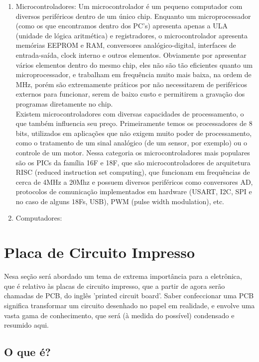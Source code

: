 \begin{enumerate}
\item Microcontroladores:
	Um microcontrolador \'e um pequeno computador com diversos perif\'ericos dentro de um \'unico chip. Enquanto um microprocessador (como os que encontramos dentro dos PC's) apresenta apenas a ULA (unidade de l\'ogica aritm\'etica) e registradores, o microcontrolador apresenta mem\'orias EEPROM e RAM, conversores anal\'ogico-digital, interfaces de entrada-sa\'ida, clock interno e outros elementos. Obviamente por apresentar v\'arios elementos dentro do mesmo chip, eles n\~ao s\~ao t\~ao eficientes quanto um microprocessador, e trabalham em frequ\^encia muito mais baixa, na ordem de MHz, por\'em s\~ao extremamente pr\'aticos por n\~ao necessitarem de perif\'ericos externos para funcionar, serem de baixo custo e permitirem a gravaç\~ao dos programas diretamente no chip.
	\\Existem microcontroladores com diversas capacidades de processamento, o que tamb\'em influencia seu preço. Primeiramente temos os processadores de 8 bits, utilizados em aplicaç\~oes que n\~ao exigem muito poder de processamento, como o tratamento de um sinal anal\'ogico (de um sensor, por exemplo) ou o controle de um motor. Nessa categoria os microcontroladores mais populares s\~ao os PICs da fam\'ilia 16F e 18F, que s\~ao microcontroladores de arquitetura RISC (reduced instruction set computing), que funcionam em frequências de cerca de 4MHz a 20Mhz e possuem diversos perif\'ericos como conversores AD, protocolos de comunicaç\~ao implementados em hardware (USART, I2C, SPI e no caso de alguns 18Fs, USB), PWM (pulse width modulation), etc.
	
\item Computadores:


\end{enumerate}



\section{Placa de Circuito Impresso}
Nesa seç\~ao ser\'a abordado um tema de extrema import\^ancia para a eletr\^onica, que \'e relativo \`as placas de circuito impresso, que a partir de agora ser\~ao chamadas de PCB, do ingl\^es 'printed circuit board'. Saber confeccionar uma PCB significa transformar um circuito desenhado no papel em realidade, e envolve uma vasta gama de conhecimento, que ser\'a (\`a medida do poss\'ivel) condensado e resumido aqui.

\subsection{O que \'e?}

